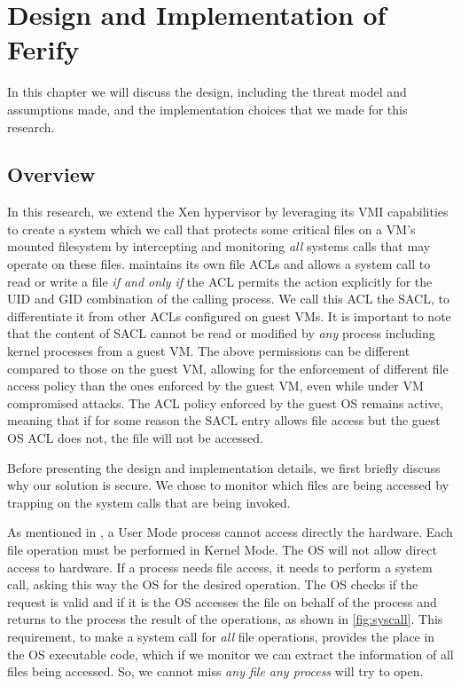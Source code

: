 \acresetall
\newcommand\tab[1][1cm]{\hspace*{#1}}
\chapter{Design and Implementation of Ferify}\label{ch:chapter3}

In this chapter we will discuss the design, including the threat model and assumptions made, and the implementation choices that we made for this research.	

\section{Overview}\label{sec:overview}

\par In this research, we extend the Xen hypervisor by leveraging its \ac{VMI} capabilities to create a system which we call  that protects some critical files on a \ac{VM}'s mounted filesystem by intercepting and monitoring \emph{all} systems calls that may operate on these files.  maintains its own file \acp{ACL} and allows a system call to read or write a file \emph{if and only if} the \ac{ACL} permits the action explicitly for the \ac{UID} and \ac{GID} combination of the calling process. We call this \ac{ACL} the \ac{SACL}, to differentiate it from other \acp{ACL} configured on guest \acp{VM}. It is important to note that the content of \ac{SACL} cannot be read or modified by \emph{any} process including kernel processes from a guest \ac{VM}. The above permissions can be different compared to those on the guest \ac{VM}, allowing for the enforcement of different file access policy than the ones enforced by the guest \ac{VM}, even while under \ac{VM} compromised attacks. The \ac{ACL} policy enforced by the guest \ac{OS} remains active, meaning that if for some reason the \ac{SACL} entry allows file access but the guest \ac{OS} \ac{ACL} does not, the file will not be accessed.

\par Before presenting the design and implementation details, we first briefly discuss why our solution is secure. We chose to monitor which files are being accessed by trapping on the system calls that are being invoked. 

\par As mentioned in \cite{linuxkernel}, a User Mode process cannot access directly the hardware. Each file operation must be performed in Kernel Mode. The \ac{OS} will not allow direct access to hardware. If a process needs file access, it needs to perform a system call, asking this way the \ac{OS} for the desired operation. The \ac{OS} checks if the request is valid and if it is the \ac{OS} accesses the file on behalf of the process and returns to the process the result of the operations, as shown in \ref{fig:syscall}. This requirement, to make a system call for \emph{all} file operations, provides the place in the \ac{OS} executable code, which if we monitor we can extract the information of all files being accessed. So, we cannot miss \emph{any file any process} will try to open.

